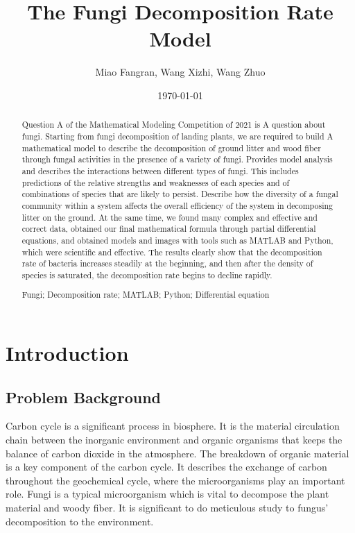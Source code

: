 \documentclass{mcmthesis}
\title{The Fungi Decomposition Rate Model}
\author{Miao Fangran, Wang Xizhi, Wang Zhuo}
\date{\today}
\begin{document}
\begin{abstract}
  Question A of the Mathematical Modeling Competition of 2021 is A question about fungi. 
  Starting from fungi decomposition of landing plants, we are required to build A mathematical model to describe the decomposition of ground litter and wood fiber through fungal activities in the presence of a variety of fungi. 
  Provides model analysis and describes the interactions between different types of fungi. 
  This includes predictions of the relative strengths and weaknesses of each species and of combinations of species that are likely to persist. 
  Describe how the diversity of a fungal community within a system affects the overall efficiency of the system in decomposing litter on the ground.
  At the same time, we found many complex and effective and correct data, obtained our final mathematical formula through partial differential equations, and obtained models and images with tools such as MATLAB and Python, which were scientific and effective.
  The results clearly show that the decomposition rate of bacteria increases steadily at the beginning, and then after the density of species is saturated, the decomposition rate begins to decline rapidly.
\begin{keywords}
  Fungi; Decomposition rate; MATLAB; Python; Differential equation
\end{keywords}
\end{abstract}
\maketitle
\tableofcontents
\newpage
\section{Introduction}
\subsection{Problem Background}
Carbon cycle is a significant process in biosphere. 
It is the material circulation chain between the inorganic environment and organic organisms that keeps the balance of carbon dioxide in the atmosphere. 
The breakdown of organic material is a key component of the carbon cycle. 
It describes the exchange of carbon throughout the geochemical cycle, where the microorganisms play an important role. 
Fungi is a typical microorganism which is vital to decompose the plant material and woody fiber. 
It is significant to do meticulous study to fungus’ decomposition to the environment.
\end{document}
